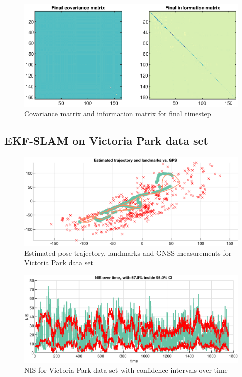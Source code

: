 \begin{figure}[!htb]
    \centering
    \includegraphics[width=0.8\linewidth]{figures/ga_3/sim_P.eps}
    \caption{Covariance matrix and information matrix for final timestep}
    \label{fig:ga_3_sim_P}
\end{figure}

\subsection{EKF-SLAM on Victoria Park data set}

\begin{figure}[!htb]
    \centering
    \includegraphics[width=0.8\linewidth]{figures/ga_3/real_trajectory.eps}
    \caption{Estimated pose trajectory, landmarks and GNSS measurements for Victoria Park data set}
    \label{fig:ga_3_real_trajectory}
\end{figure}

\begin{figure}[!htb]
    \centering
    \includegraphics[width=0.8\linewidth]{figures/ga_3/real_NIS.eps}
    \caption{NIS for Victoria Park data set with confidence intervals over time}
    \label{fig:ga_3_real_NIS}
\end{figure}